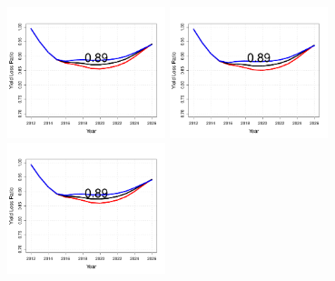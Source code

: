 \begin{figure}[htbp]
	\centering
		\includegraphics[height=1.5in]{../FIGURES/YLR/fig_SQUO_DI_ylr.pdf}
		\includegraphics[height=1.5in]{../FIGURES/YLR/fig_BSAI_DI_ylr.pdf}
		\includegraphics[height=1.5in]{../FIGURES/YLR/fig_GULF_DI_ylr.pdf}
                                

\end{figure}
